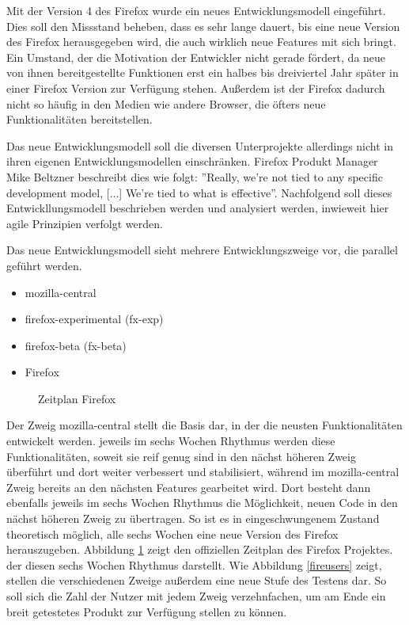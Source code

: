 Mit der Version 4 des Firefox wurde ein neues Entwicklungsmodell eingeführt. Dies soll den Missstand beheben, dass es sehr lange dauert, bis eine neue Version des Firefox herausgegeben wird, die auch wirklich neue Features mit sich bringt. Ein Umstand, der die Motivation der Entwickler nicht gerade fördert, da neue von ihnen bereitgestellte Funktionen erst ein halbes bis dreiviertel Jahr später in einer Firefox Version zur Verfügung stehen. Außerdem ist der Firefox dadurch nicht so häufig in den Medien wie andere Browser, die öfters neue Funktionalitäten bereitstellen.

Das neue Entwicklungsmodell soll die diversen Unterprojekte allerdings nicht in ihren eigenen Entwicklungsmodellen einschränken. Firefox Produkt Manager Mike Beltzner beschreibt dies wie folgt: ''Really, we're not tied to any specific development model, [...] We're tied to what is effective''\cite{bib:beltzner}. Nachfolgend soll dieses Entwickllungsmodell beschrieben werden und analysiert werden, inwieweit hier agile Prinzipien verfolgt werden.

Das neue Entwicklungsmodell sieht mehrere Entwicklungszweige vor, die pa\-ra\-llel geführt werden.
\begin{itemize}
\item mozilla-central
\item firefox-experimental (fx-exp)
\item firefox-beta (fx-beta)
\item Firefox
\end{itemize}
\begin{figure}[h]
	\centering
	\caption{Zeitplan Firefox\cite{bib:fire-development}}
	\label{firett}
\end{figure}

Der Zweig mozilla-central stellt die Basis dar, in der die neusten Funktionalitäten entwickelt werden. jeweils im sechs Wochen Rhythmus werden diese Funktionalitäten, soweit sie reif genug sind in den nächst höheren Zweig überführt und dort weiter verbessert und stabilisiert, während im mozilla-central Zweig bereits an den nächsten Features gearbeitet wird. Dort besteht dann ebenfalls jeweils im sechs Wochen Rhythmus die Möglichkeit, neuen Code in den nächst höheren Zweig zu übertragen. So ist es in eingeschwungenem Zustand theoretisch möglich,  alle sechs Wochen eine neue Version des Firefox herauszugeben. Abbildung \ref{firett} zeigt den offiziellen Zeitplan des Firefox Projektes. der diesen sechs Wochen Rhythmus darstellt. Wie Abbildung \ref{fireusers} zeigt, stellen die verschiedenen Zweige außerdem eine neue Stufe des Testens dar. So soll sich die Zahl der Nutzer mit jedem Zweig verzehnfachen, um am Ende ein breit getestetes Produkt zur Verfügung stellen zu können.


